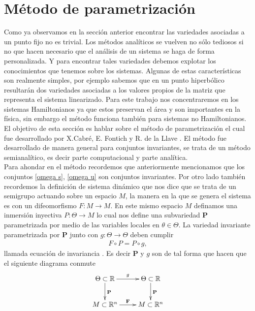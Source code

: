 \section{Método de parametrización}
Como ya observamos en la sección anterior encontrar las variedades asociadas a un punto fijo no es trivial. Los métodos analíticos se vuelven no sólo tediosos si no que hacen necesario que el análisis de un sistema se haga de forma personalizada. Y para encontrar tales variedades debemos explotar los conocimientos que tenemos sobre los sistemas. Algunas de estas características son realmente simples, por ejemplo sabemos que en un punto hiperbólico resultarán dos variedades asociadas a los valores propios de la matriz que representa el sistema linearizado. Para este trabajo nos concentraremos en los sistemas Hamiltonianos ya que estos preservan el área y son importantes en la física, sin embargo el método funciona también para sistemas no Hamiltonianos. El objetivo de esta sección es hablar sobre el método de parametrización el cual fue desarrollado por X.Cabré, E. Fontich y R. de la Llave \cite{Haro}. El método fue desarrollado de manera general para conjuntos invariantes, se trata de un método semianalítico, es decir parte computacional y parte analítica.\\

Para ahondar en el método recordemos que anteriormente mencionamos que los conjuntos \ref{omega s}, \ref{omega u} son conjuntos invariantes. Por otro lado también recordemos la definición de sistema dinámico que nos dice que se trata de un semigrupo actuando sobre un espacio $M$, la manera en la que se genera el sistema es con un difeomorfismo $F:M \rightarrow M$. En este mismo espacio $M$ definamos una inmersión inyectiva $P:\Theta \rightarrow M$  lo cual nos define una subvariedad $\textbf{P}$  parametrizada por medio de las variables locales en $\theta \in \Theta$. La variedad invariante parametrizada por $\textbf{P}$  junto con $g:\Theta \rightarrow \Theta$ deben cumplir 
\begin{eqnarray}
F \circ P = P \circ g,  \label{Ecua de invariancia}
\end{eqnarray}
llamada ecuación de invariancia \cite{Haro}.
Es decir $\textbf{P}$ y $g$ son de tal forma que hacen que el siguiente diagrama conmute
\begin{eqnarray}
\xymatrix{
\Theta\subset\mathbb{R} \ar[d]^{\textbf{P}} \ar[r]^{g} & \Theta\subset\mathbb{R} \ar[d]^{\textbf{P}} \\
M\subset\mathbb{R}^{n} \ar[r]^{\textbf{F}} & M\subset\mathbb{R}^{n}
}\label{conmutativo}
\end{eqnarray}


